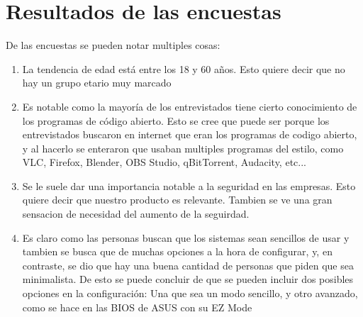 \documentclass{article}
\begin{document}
\section{Resultados de las encuestas}
De las encuestas se pueden notar multiples cosas:
\begin{enumerate}
	\item La tendencia de edad está entre los 18 y 60 años. Esto quiere decir que no hay un grupo etario muy marcado
	\item Es notable como la mayoría de los entrevistados tiene cierto conocimiento de los programas de código abierto.
	      Esto se cree que puede ser porque los entrevistados buscaron en internet que eran los programas de codigo abierto,
	      y al hacerlo se enteraron que usaban multiples programas del estilo, como VLC, Firefox, Blender, OBS Studio, qBitTorrent,
	      Audacity, etc...
	\item Se le suele dar una importancia notable a la seguridad en las empresas. Esto quiere decir que nuestro producto es relevante.
	      Tambien se ve una gran sensacion de necesidad del aumento de la seguirdad.
	\item Es claro como las personas buscan que los sistemas sean sencillos de usar y tambien se busca
	      que de muchas opciones a la hora de configurar, y, en contraste, se dio que hay una buena cantidad de personas que piden que sea minimalista.
	      De esto se puede concluir de que se pueden incluir dos posibles opciones en la configuración:
	      Una que sea un modo sencillo, y otro avanzado, como se hace en las BIOS de ASUS con su EZ Mode
\end{enumerate}
\end{document}

